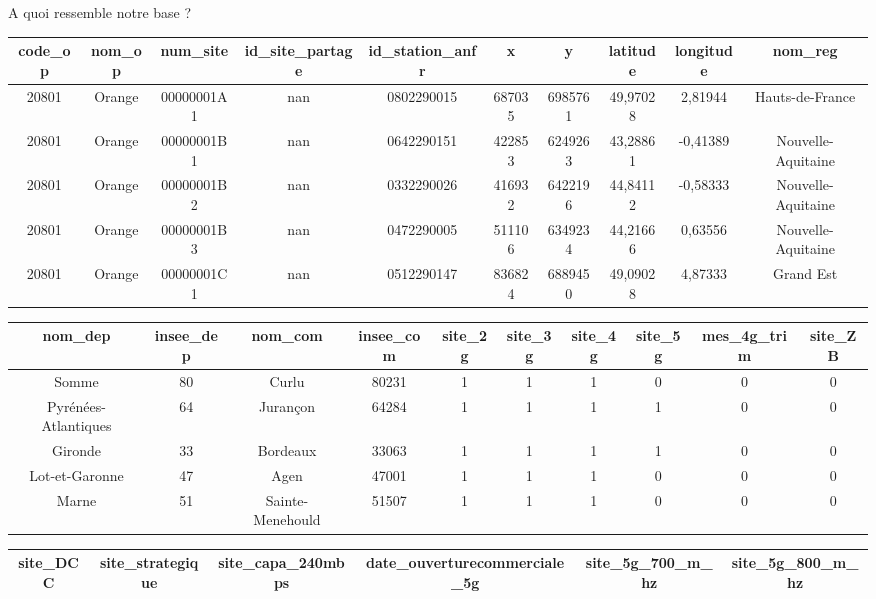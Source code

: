 \documentclass[french, 9pt,xcolor={table,dvipsnames},t,aspectratio=169,onlytextwidth,mathserif]{beamer}
\begin{document}
{
\smallframetitle
\begin{frame}{A quoi ressemble notre base ?}
    \begin{table}[H]
        \centering
        \tiny
        \begin{tabular}{cccccccccc}
        \hline
            \textbf{code\_op} & \textbf{nom\_op} & \textbf{num\_site} & \textbf{id\_site\_partage} & \textbf{id\_station\_anfr} & \textbf{x} & \textbf{y} & \textbf{latitude} & \textbf{longitude} & \textbf{nom\_reg} \\ \hline
            20801 & Orange & 00000001A1 & nan & 0802290015 & 687035 & 6985761 & 49,97028 & 2,81944 & Hauts-de-France \\ 
            20801 & Orange & 00000001B1 & nan & 0642290151 & 422853 & 6249263 & 43,28861 & -0,41389 & Nouvelle-Aquitaine \\ 
            20801 & Orange & 00000001B2 & nan & 0332290026 & 416932 & 6422196 & 44,84112 & -0,58333 & Nouvelle-Aquitaine \\ 
            20801 & Orange & 00000001B3 & nan & 0472290005 & 511106 & 6349234 & 44,21666 & 0,63556 & Nouvelle-Aquitaine \\ 
            20801 & Orange & 00000001C1 & nan & 0512290147 & 836824 & 6889450 & 49,09028 & 4,87333 & Grand Est \\ \hline
        \end{tabular}
        \begin{tabular}{cccccccccc}
        \hline
            \textbf{nom\_dep} & \textbf{insee\_dep} & \textbf{nom\_com} & \textbf{insee\_com} & \textbf{site\_2g} & \textbf{site\_3g} & \textbf{site\_4g} & \textbf{site\_5g} & \textbf{mes\_4g\_trim} & \textbf{site\_ZB} \\ \hline
            Somme & 80 & Curlu & 80231 & 1 & 1 & 1 & 0 & 0 & 0 \\ 
            Pyrénées-Atlantiques & 64 & Jurançon & 64284 & 1 & 1 & 1 & 1 & 0 & 0 \\ 
            Gironde & 33 & Bordeaux & 33063 & 1 & 1 & 1 & 1 & 0 & 0 \\ 
            Lot-et-Garonne & 47 & Agen & 47001 & 1 & 1 & 1 & 0 & 0 & 0 \\ 
            Marne & 51 & Sainte-Menehould & 51507 & 1 & 1 & 1 & 0 & 0 & 0 \\ \hline
        \end{tabular}
        \begin{tabular}{cccccc}
        \hline
            \textbf{site\_DCC} & \textbf{site\_strategique} & \textbf{site\_capa\_240mbps} & \textbf{date\_ouverturecommerciale\_5g} & \textbf{site\_5g\_700\_m\_hz} & \textbf{site\_5g\_800\_m\_hz} \\ \hline

\end{tabular}
\end{table}
\end{frame}}
\end{document}
